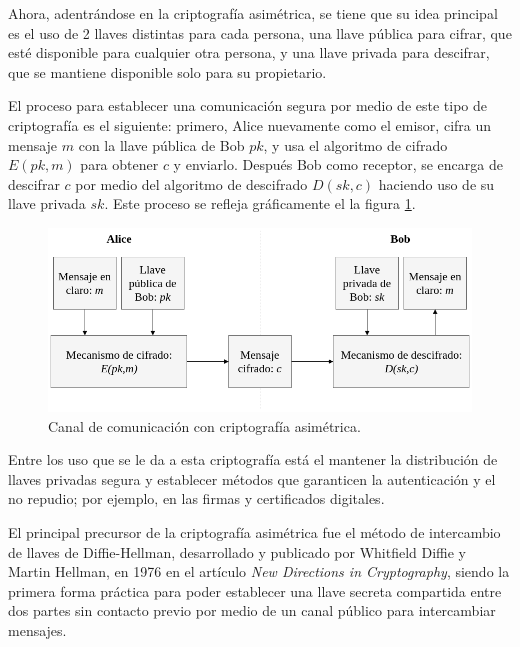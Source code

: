   Ahora, adentrándose en la criptografía asimétrica, se tiene que su idea
  principal es el uso de 2 llaves distintas para cada persona, una llave
  pública para cifrar, que esté disponible para cualquier otra persona, y una
  llave privada para descifrar, que se mantiene disponible solo para su
  propietario.

  El proceso para establecer una comunicación segura por medio de este tipo
  de criptografía es el siguiente: primero, Alice nuevamente como el emisor,
  cifra un mensaje $m$ con la llave pública de Bob $pk$, y usa el algoritmo de
  cifrado $E(pk,m)$ para obtener $c$ y enviarlo. Después Bob como receptor,
  se encarga de descifrar $c$ por medio del algoritmo de descifrado
  $D(sk,c)$ haciendo uso de su llave privada $sk$. Este proceso se refleja
  gráficamente el la figura \ref{cripto_asimetrica}.

  \begin{figure}[H]
    \begin{center}
      \includegraphics[width=0.8\linewidth]
        {contenidos/antecedentes/intro/img/cripto_asimetrica.png}
      \caption{Canal de comunicación con criptografía asimétrica.}
      \label{cripto_asimetrica}
    \end{center}
  \end{figure}

  Entre los uso que se le da a esta criptografía está el mantener la
  distribución de llaves privadas segura y establecer métodos que garanticen
  la autenticación y el no repudio; por ejemplo, en las firmas y
  certificados digitales.

  El principal precursor de la criptografía asimétrica fue el método de 
  intercambio de llaves de Diffie-Hellman, desarrollado y publicado por 
  Whitfield Diffie y Martin Hellman, en 1976 en el artículo \textit{New 
  Directions in Cryptography}, siendo la primera forma práctica para poder 
  establecer una llave secreta compartida entre dos partes sin contacto 
  previo por medio de un canal público para intercambiar mensajes.

